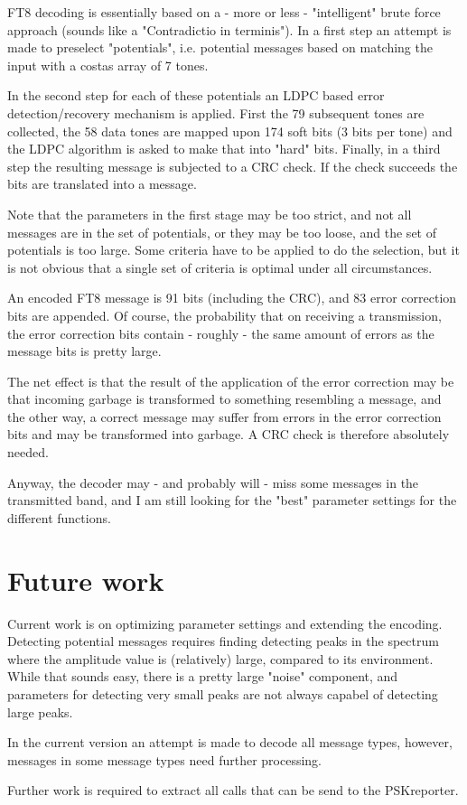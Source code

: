 \documentclass[11pt]{article}
\begin{document}
FT8 decoding is essentially based on a - more or less - "intelligent"
brute force approach (sounds like a "Contradictio in terminis").
In a first step an attempt is made to preselect 
"potentials", i.e. potential messages based on matching the
input with a costas array of 7 tones.
\par
In the second step for each of these potentials an LDPC based
error detection/recovery mechanism is applied. First the 79 subsequent
tones are collected, the 58 data tones are mapped upon 174
soft bits (3 bits per tone) and the LDPC algorithm is asked
to make that into "hard" bits.
Finally, in a third step the resulting message is subjected to
a CRC check.
If the check succeeds the bits are translated into a message.
\par
Note that the parameters in the first stage may be too strict,
and not all messages are in the set of potentials, or they may be too loose,
and the set of potentials is too large. Some criteria have to be applied to
do the selection, but it is not obvious that a single set of criteria
is optimal under all circumstances.
\par
An encoded FT8 message is 91 bits (including the CRC),
and 83 error correction bits are appended.
Of course, the probability that on receiving a transmission, the 
error correction bits contain - roughly - the same amount of errors
as the message bits is pretty large.
\par
The net effect is that the result of the application of the error correction
may be that incoming garbage is transformed to something resembling a
message, and the other way, a correct message may suffer from
errors in the error correction bits and may be transformed into
garbage. A CRC check is therefore absolutely needed.
\par
Anyway, the decoder may - and probably will - miss some messages
in the transmitted band,
and I am still looking for the "best" parameter settings for the
different functions.
\section{Future work}
Current work is on optimizing 
parameter settings and extending the encoding.
Detecting potential messages requires finding detecting peaks in the spectrum
where the amplitude value is (relatively) large, compared to its environment.
While that sounds easy, there is a pretty large "noise" component,
and parameters for detecting very small peaks are not always capabel of
detecting large peaks.
\par
In the current version an attempt is made to decode all message types,
however, messages in some message types need further processing.
\par
Further work is required to extract all calls that can be send to the PSKreporter.
\end{document}

